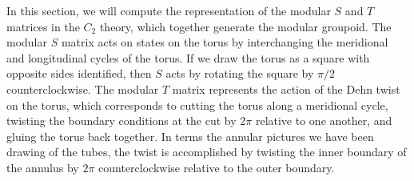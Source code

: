 \documentclass[12pt,a4paper]{article}
\begin{document}
In this section, we will compute the representation of the modular $S$ and $T$ matrices in the $C_2$ theory, which together generate the modular groupoid. 
The modular $S$ matrix acts on states on the torus by interchanging the meridional and longitudinal cycles 
of the torus.
If we draw the torus as a square with opposite sides identified, then $S$ acts by rotating the square by $\pi/2$ counterclockwise. 
The modular $T$ matrix represents the action of the Dehn twist on the torus, 
which corresponds to cutting the torus along a meridional cycle, 
twisting the boundary conditions at the cut by $2\pi$ relative to one another, and gluing the torus back together.
In terms the annular pictures we have been drawing of the tubes, the twist is accomplished by 
twisting the inner boundary of the annulus by $2\pi$ counterclockwise relative to the outer boundary. 
\end{document}
